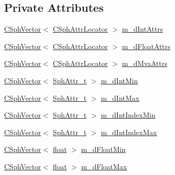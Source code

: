 \subsection*{Private Attributes}
\begin{DoxyCompactItemize}
\item 
\hyperlink{classCSphVector}{C\-Sph\-Vector}$<$ \hyperlink{structCSphAttrLocator}{C\-Sph\-Attr\-Locator} $>$ \hyperlink{classAttrIndexBuilder__t_af1d84506819b5d03c89c8e1fd1ac7eef}{m\-\_\-d\-Int\-Attrs}
\item 
\hyperlink{classCSphVector}{C\-Sph\-Vector}$<$ \hyperlink{structCSphAttrLocator}{C\-Sph\-Attr\-Locator} $>$ \hyperlink{classAttrIndexBuilder__t_abfa55e87fb3522a3da3e1618aa735ed2}{m\-\_\-d\-Float\-Attrs}
\item 
\hyperlink{classCSphVector}{C\-Sph\-Vector}$<$ \hyperlink{structCSphAttrLocator}{C\-Sph\-Attr\-Locator} $>$ \hyperlink{classAttrIndexBuilder__t_a93044612daa6c5014232d65ac244b929}{m\-\_\-d\-Mva\-Attrs}
\item 
\hyperlink{classCSphVector}{C\-Sph\-Vector}$<$ \hyperlink{sphinx_8h_a7c122d91b0b52a0214ba176636bb1561}{Sph\-Attr\-\_\-t} $>$ \hyperlink{classAttrIndexBuilder__t_a67e4137dd4df1d5b23aaaaa42abd87ac}{m\-\_\-d\-Int\-Min}
\item 
\hyperlink{classCSphVector}{C\-Sph\-Vector}$<$ \hyperlink{sphinx_8h_a7c122d91b0b52a0214ba176636bb1561}{Sph\-Attr\-\_\-t} $>$ \hyperlink{classAttrIndexBuilder__t_aa08e50525c47ead7e28a304929fd0163}{m\-\_\-d\-Int\-Max}
\item 
\hyperlink{classCSphVector}{C\-Sph\-Vector}$<$ \hyperlink{sphinx_8h_a7c122d91b0b52a0214ba176636bb1561}{Sph\-Attr\-\_\-t} $>$ \hyperlink{classAttrIndexBuilder__t_aa12e412aa68109a80bf563b01c030444}{m\-\_\-d\-Int\-Index\-Min}
\item 
\hyperlink{classCSphVector}{C\-Sph\-Vector}$<$ \hyperlink{sphinx_8h_a7c122d91b0b52a0214ba176636bb1561}{Sph\-Attr\-\_\-t} $>$ \hyperlink{classAttrIndexBuilder__t_a5fcd007cce05f4aedab96831c85fc1cb}{m\-\_\-d\-Int\-Index\-Max}
\item 
\hyperlink{classCSphVector}{C\-Sph\-Vector}$<$ \hyperlink{sphinxexpr_8cpp_a0e0d0739f7035f18f949c2db2c6759ec}{float} $>$ \hyperlink{classAttrIndexBuilder__t_a89dc803219d68492d04aa0d6a1e28a2c}{m\-\_\-d\-Float\-Min}
\item 
\hyperlink{classCSphVector}{C\-Sph\-Vector}$<$ \hyperlink{sphinxexpr_8cpp_a0e0d0739f7035f18f949c2db2c6759ec}{float} $>$ \hyperlink{classAttrIndexBuilder__t_ab351806adf13405734f13b951ffd9618}{m\-\_\-d\-Float\-Max}
\item 

\end{DoxyCompactItemize}

